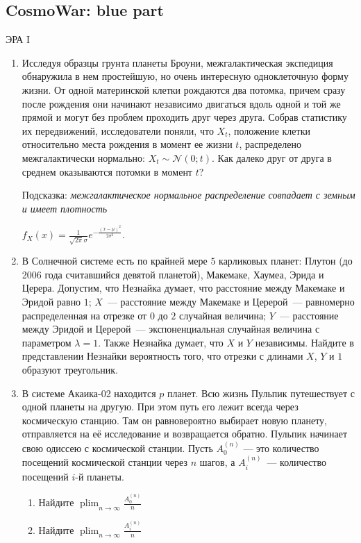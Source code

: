 \documentclass[12pt, a4paper]{article}\usepackage[]{graphicx}\usepackage[]{color}
\DeclareMathOperator*\plim{plim}
\begin{document}
						\subsection{CosmoWar: blue part}

						\begin{center}
							ЭРА I
						\end{center}

						\begin{enumerate}
							\item Исследуя образцы грунта планеты Броуни, межгалактическая экспедиция обнаружила в нем простейшую, но очень интересную одноклеточную форму жизни. От одной материнской клетки рождаются два потомка, причем сразу после рождения они начинают независимо двигаться вдоль одной и той же прямой и могут без проблем проходить друг через друга. Собрав статистику их передвижений, исследователи поняли, что $X_t$, положение клетки относительно места рождения в момент ее жизни $t$, распределено межгалактически нормально: $X_t\sim \mathcal{N}(0; t)$. Как далеко друг от друга в среднем оказываются потомки в момент $t$?


							Подсказка: \textit{межгалактическое нормальное распределение совпадает с земным и имеет плотность}

							$f_X(x) = \frac{1}{\sqrt{2\pi}\sigma}e^{-\frac{(x-\mu)^2}{2\sigma^2}}$.

							\item В Солнечной системе есть по крайней мере $5$ карликовых планет: Плутон (до 2006 года считавшийся девятой планетой), Макемаке, Хаумеа, Эрида и Церера. Допустим, что Незнайка думает, что расстояние между Макемаке и Эридой равно $1$;  $X$~--- расстояние между Макемаке и Церерой~--- равномерно распределенная на отрезке от $0$ до $2$ случайная величина; $Y$~--- расстояние между Эридой и Церерой~--- экспоненциальная случайная величина с параметром $\lambda = 1$. Также Незнайка думает, что $X$ и $Y$ независимы. Найдите в представлении Незнайки вероятность того, что отрезки с длинами $X$, $Y$ и $1$ образуют треугольник.

							\item  В системе Акаика-02 находится $p$ планет. Всю жизнь Пульпик путешествует с одной планеты на другую. При этом путь его лежит всегда через космическую станцию. Там он равновероятно выбирает новую планету, отправляется на её исследование и возвращается обратно. Пульпик начинает свою одиссею с космической станции. Пусть $A_0^{(n)}$ — это количество посещений космической станции через $n$ шагов, а $A_i^{(n)}$~--- количество посещений $i$-й планеты.

							\begin{enumerate}
								\item Найдите $\plim_{n \rightarrow \infty} \frac{A_0^{(n)}}{n}$
								\item Найдите $\plim_{n \rightarrow \infty} \frac{A_i^{(n)}}{n}$
							\end{enumerate}


						\end{enumerate}
\end{document}
